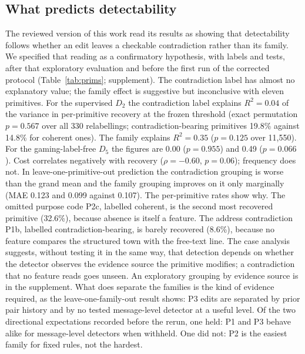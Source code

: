 \documentclass[conference]{IEEEtran}
\begin{document}
\subsection{What predicts detectability}\label{sec:ct}
The reviewed version of this work read its results as showing that
detectability follows whether an edit leaves a checkable contradiction rather
than its family. We specified that reading as a confirmatory hypothesis, with labels and
tests, after that exploratory evaluation and before the first run of the
corrected protocol (Table~\ref{tab:prims}; supplement). The contradiction label has almost no explanatory value; the family effect
is suggestive but inconclusive with eleven primitives. For the supervised
$D_2$ the contradiction
label explains $R^2=0.04$ of the variance in per-primitive recovery
at the frozen threshold (exact permutation $p=0.567$ over all 330
relabellings; contradiction-bearing primitives 19.8\% against
14.8\% for coherent ones). The family explains $R^2=0.35$
($p=0.125$ over 11,550). For the gaming-label-free $D_5$ the figures are
0.00 ($p=0.955$) and 0.49 ($p=0.066$). Cost
correlates negatively with recovery ($\rho=-0.60$,
$p=0.06$); frequency does not. In leave-one-primitive-out prediction the
contradiction grouping is worse than the grand mean and the family grouping
improves on it only marginally (MAE 0.123 and 0.099 against
0.107). The per-primitive rates show why.
The omitted purpose code P2c, labelled coherent, is the second most recovered
primitive (32.6\%), because absence is itself a feature. The
address contradiction P1b, labelled contradiction-bearing, is barely
recovered (8.6\%), because no feature compares the structured
town with the free-text line. The case analysis suggests, without testing it in the same way, that
detection depends on whether the detector observes the evidence source the
primitive modifies; a contradiction that no feature reads goes unseen. An
exploratory grouping by evidence source is in the supplement. What does
separate the families is the kind of evidence required, as the
leave-one-family-out result shows: P3 edits are separated by prior pair history
and by no tested message-level detector at a useful level. Of the two directional expectations recorded
before the rerun, one held: P1 and P3 behave alike for message-level
detectors when withheld. One did not: P2 is the easiest family for fixed
rules, not the hardest.
\end{document}

